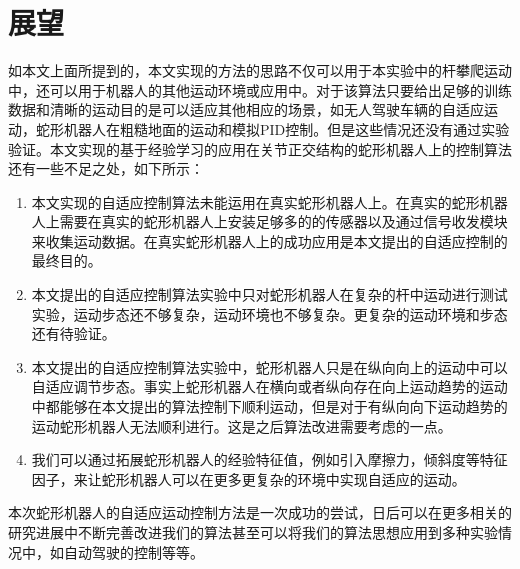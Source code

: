 \section{展望}
如本文上面所提到的，本文实现的方法的思路不仅可以用于本实验中的杆攀爬运动中，还可以用于机器人的其他运动环境或应用中。对于该算法只要给出足够的训练数据和清晰的运动目的是可以适应其他相应的场景，如无人驾驶车辆的自适应运动，蛇形机器人在粗糙地面的运动和模拟PID控制。但是这些情况还没有通过实验验证。本文实现的基于经验学习的应用在关节正交结构的蛇形机器人上的控制算法还有一些不足之处，如下所示：
\begin{enumerate}
	\item 本文实现的自适应控制算法未能运用在真实蛇形机器人上。在真实的蛇形机器人上需要在真实的蛇形机器人上安装足够多的的传感器以及通过信号收发模块来收集运动数据。在真实蛇形机器人上的成功应用是本文提出的自适应控制的最终目的。
	\item 本文提出的自适应控制算法实验中只对蛇形机器人在复杂的杆中运动进行测试实验，运动步态还不够复杂，运动环境也不够复杂。更复杂的运动环境和步态还有待验证。
	\item 本文提出的自适应控制算法实验中，蛇形机器人只是在纵向向上的运动中可以自适应调节步态。事实上蛇形机器人在横向或者纵向存在向上运动趋势的运动中都能够在本文提出的算法控制下顺利运动，但是对于有纵向向下运动趋势的运动蛇形机器人无法顺利进行。这是之后算法改进需要考虑的一点。
	\item 我们可以通过拓展蛇形机器人的经验特征值，例如引入摩擦力，倾斜度等特征因子，来让蛇形机器人可以在更多更复杂的环境中实现自适应的运动。
\end{enumerate}

本次蛇形机器人的自适应运动控制方法是一次成功的尝试，日后可以在更多相关的研究进展中不断完善改进我们的算法甚至可以将我们的算法思想应用到多种实验情况中，如自动驾驶的控制等等。

